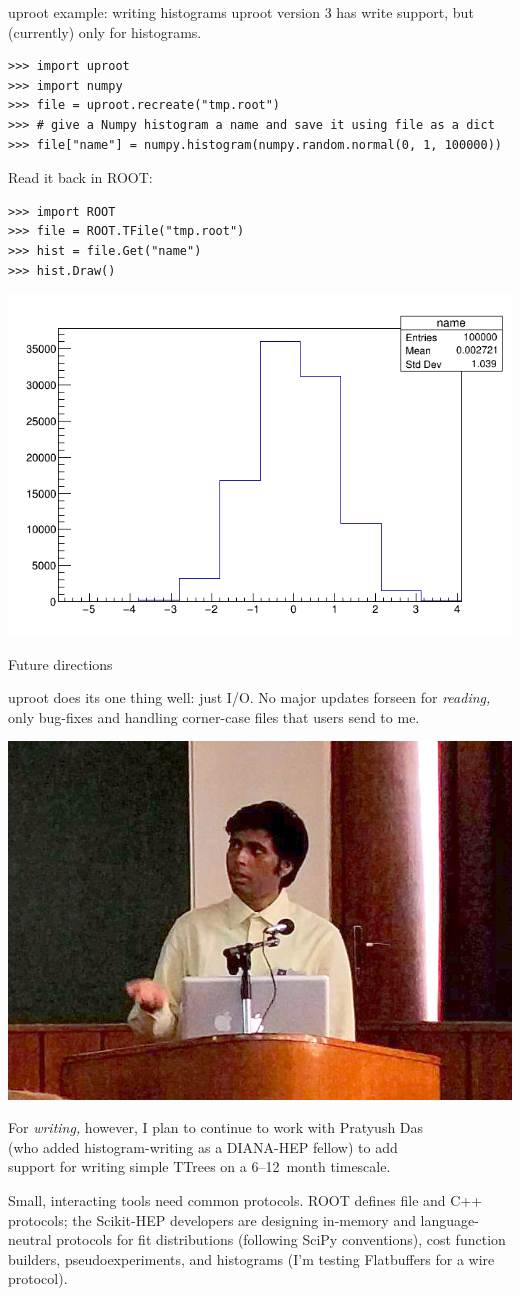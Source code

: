 \documentclass[aspectratio=169]{beamer}
\begin{document}
\begin{frame}[fragile]{uproot example: writing histograms}
\large
\vspace{0.25 cm}
uproot version 3 has write support, but (currently) only for histograms.

\small
\begin{verbatim}
>>> import uproot
>>> import numpy
>>> file = uproot.recreate("tmp.root")
>>> # give a Numpy histogram a name and save it using file as a dict
>>> file["name"] = numpy.histogram(numpy.random.normal(0, 1, 100000))
\end{verbatim}

\vspace{1 cm}
\large
Read it back in ROOT:

\small
\begin{verbatim}
>>> import ROOT
>>> file = ROOT.TFile("tmp.root")
>>> hist = file.Get("name")
>>> hist.Draw()
\end{verbatim}

\vspace{-3.5 cm}
\hfill \includegraphics[width=0.5\linewidth]{root-hist.png}
\end{frame}

\begin{frame}{Future directions}
\vspace{0.5 cm}

uproot does its one thing well: just I/O. No major updates forseen for {\it reading,} only bug-fixes and handling corner-case files that users send to me.

\vspace{0.75 cm}
\hfill \includegraphics[height=2 cm]{pratyush.jpg}

\vspace{-2 cm}
For {\it writing,} however, I plan to continue to work with Pratyush Das \\ (who added histogram-writing as a DIANA-HEP fellow) to add \\ support for writing simple TTrees on a 6--12~month timescale.

\vspace{0.75 cm}
Small, interacting tools need common protocols. ROOT defines file and C++ protocols; the Scikit-HEP developers are designing in-memory and language-neutral protocols for fit distributions (following SciPy conventions), cost function builders, pseudoexperiments, and histograms (I'm testing Flatbuffers for a wire protocol).
\end{frame}
\end{document}
